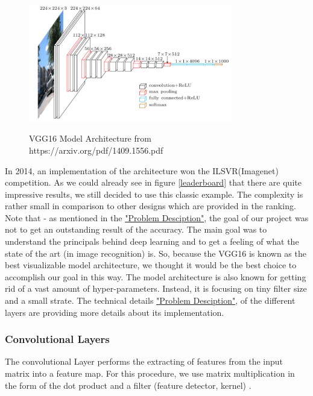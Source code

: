 \documentclass[journal]{IEEEtran}
\begin{document}
\begin{figure}
  \begin{center}
	  \includegraphics[width=3.5in]{photo/vgg16.png}\\
  \caption{VGG16 Model Architecture from https://arxiv.org/pdf/1409.1556.pdf}\label{vgg16}
  \end{center}
\end{figure}

In 2014, an implementation of the architecture won the ILSVR(Imagenet) competition. As we could already see in figure \ref{leaderboard} that there are quite impressive results, we still decided to use this classic example. The complexity is rather small in comparison to other designs which are provided in the ranking. Note that - as  mentioned in the \hyperref[sec:problemDescription]{"Problem Desciption"}, the goal of our project was not to get an outstanding result of the accuracy. The main goal was  to understand the principals behind deep learning and to get a feeling of what the state of the art (in image recognition) is. So, because the VGG16 \cite{RN15} is known as the best visualizable model architecture, we thought it would be the best choice to accomplish our goal in this way. The model architecture is also known for getting rid of a vast amount of hyper-parameters. Instead, it is focusing on tiny filter size and a small strate. The technical details \hyperref[sec:techDetails]{"Problem Desciption"}, of the different layers are providing more details about its implementation. 
\subsubsection{Convolutional Layers}
\noindent The convolutional Layer performs the extracting of features from the input matrix into a feature map. For this procedure, we use matrix multiplication in the form of the dot product and a filter (feature detector, kernel) \cite{Goodfellow-et-al-2016}. 
\end{document}
